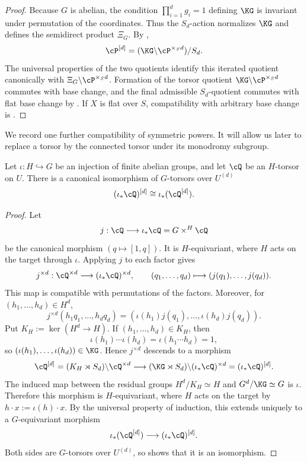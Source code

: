 \begin{proof}
Because $G$ is abelian, the condition $\prod_{i=1}^d g_i=1$ defining
$\KG$ is invariant under permutation of the coordinates. Thus the
$S_d$-action normalizes $\KG$ and defines the semidirect product $\Xi_G$.
By ,
\[
\cP^{[d]}=(\KG\backslash\cP^{\times_S d})/S_d.
\]
The universal properties of the two quotients identify this iterated
quotient canonically with $\Xi_G\backslash\cP^{\times_S d}$. Formation of
the torsor quotient $\KG\backslash\cP^{\times_S d}$ commutes with base
change, and the final admissible $S_d$-quotient commutes with flat base
change by \cite[V.1.9]{sga1}. If $X$ is flat over $S$, compatibility with
arbitrary base change is \cite[Proposition~2.33]{Guignard2018}.
\end{proof}

We record one further compatibility of symmetric powers. It will allow us
later to replace a torsor by the connected torsor under its monodromy
subgroup.

\begin{lemma}
\label{lemma:symmetric_power_induced_torsor}
Let $\iota:H\hookrightarrow G$ be an injection of finite abelian groups, and
let $\cQ$ be an $H$-torsor on $U$. There is a canonical isomorphism of
$G$-torsors over $U^{(d)}$
\[
    (\iota_*\cQ)^{[d]}\cong\iota_*(\cQ^{[d]}).
\]
\end{lemma}

\begin{proof}
Let
\[
    j:\cQ\longrightarrow\iota_*\cQ=G\times^H\cQ
\]
be the canonical morphism $(q\mapsto[1,q])$. It is $H$-equivariant, where
$H$ acts on the target through $\iota$. Applying $j$ to each factor gives
\[
    j^{\times d}:\cQ^{\times d}\longrightarrow(\iota_*\cQ)^{\times d},
    \qquad
    (q_1,\dots,q_d)\longmapsto(j(q_1),\dots,j(q_d)).
\]
This map is compatible with permutations of the factors. Moreover, for
$(h_1,\dots,h_d)\in H^d$,
\[
    j^{\times d}(h_1q_1,\dots,h_dq_d)
      =(\iota(h_1)j(q_1),\dots,\iota(h_d)j(q_d)).
\]
Put $K_H:=\ker(H^d\to H)$. If $(h_1,\dots,h_d)\in K_H$, then
\[
    \iota(h_1)\cdots\iota(h_d)
      =\iota(h_1\cdots h_d)=1,
\]
so $(\iota(h_1),\dots,\iota(h_d))\in\KG$. Hence $j^{\times d}$ descends to
a morphism
\[
    \cQ^{[d]}=(K_H\rtimes S_d)\backslash\cQ^{\times d}
       \longrightarrow
    (\KG\rtimes S_d)\backslash(\iota_*\cQ)^{\times d}
       =(\iota_*\cQ)^{[d]}.
\]
The induced map between the residual groups
$H^d/K_H\simeq H$ and $G^d/\KG\simeq G$ is $\iota$. Therefore this morphism
is $H$-equivariant, where $H$ acts on the target by
$h\cdot x:=\iota(h)\cdot x$.
By the universal property of induction, this extends uniquely to a
$G$-equivariant morphism
\[
    \iota_*(\cQ^{[d]})\longrightarrow(\iota_*\cQ)^{[d]}.
\]
Both sides are $G$-torsors over $U^{(d)}$, so
 shows that it is an isomorphism.
\end{proof}




